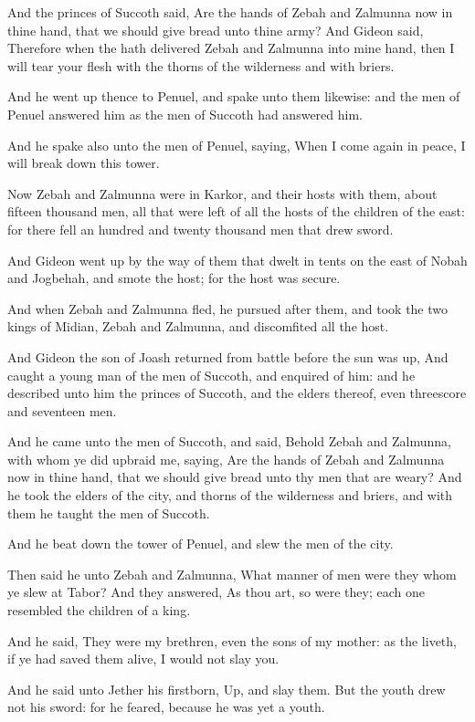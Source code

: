 \Verse And the princes of Succoth said, Are the hands of Zebah and Zalmunna now in thine hand, that we should give bread unto thine army?  \Verse And Gideon said, Therefore when the \LORD hath delivered Zebah and Zalmunna into mine hand, then I will tear your flesh with the thorns of the wilderness and with briers.

\Verse And he went up thence to Penuel, and spake unto them likewise: and the men of Penuel answered him as the men of Succoth had answered him.

\Verse And he spake also unto the men of Penuel, saying, When I come again in peace, I will break down this tower.

\Verse Now Zebah and Zalmunna were in Karkor, and their hosts with them, about fifteen thousand men, all that were left of all the hosts of the children of the east: for there fell an hundred and twenty thousand men that drew sword.

\Verse And Gideon went up by the way of them that dwelt in tents on the east of Nobah and Jogbehah, and smote the host; for the host was secure.

\Verse And when Zebah and Zalmunna fled, he pursued after them, and took the two kings of Midian, Zebah and Zalmunna, and discomfited all the host.

\Verse And Gideon the son of Joash returned from battle before the sun was up, \Verse And caught a young man of the men of Succoth, and enquired of him: and he described unto him the princes of Succoth, and the elders thereof, even threescore and seventeen men.

\Verse And he came unto the men of Succoth, and said, Behold Zebah and Zalmunna, with whom ye did upbraid me, saying, Are the hands of Zebah and Zalmunna now in thine hand, that we should give bread unto thy men that are weary?  \Verse And he took the elders of the city, and thorns of the wilderness and briers, and with them he taught the men of Succoth.

\Verse And he beat down the tower of Penuel, and slew the men of the city.

\Verse Then said he unto Zebah and Zalmunna, What manner of men were they whom ye slew at Tabor? And they answered, As thou art, so were they; each one resembled the children of a king.

\Verse And he said, They were my brethren, even the sons of my mother: as the \LORD liveth, if ye had saved them alive, I would not slay you.

\Verse And he said unto Jether his firstborn, Up, and slay them. But the youth drew not his sword: for he feared, because he was yet a youth.

